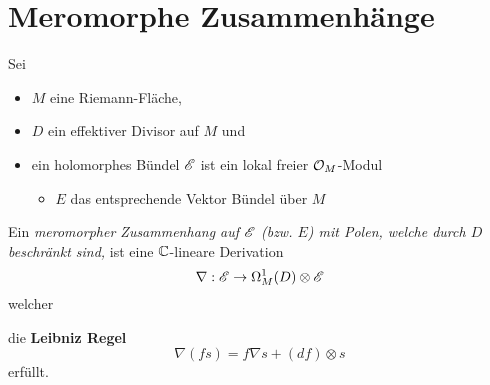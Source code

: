 \section{Meromorphe Zusammenhänge} %
Sei
\begin{itemize}
  \item $M$ eine Riemann-Fläche\marginnote{$\C$},
  \item $D$ ein effektiver Divisor auf $M$ und
  \item ein holomorphes Bündel $\mathscr{E}$ ist ein lokal freier $\mathcal{O}_M$-Modul
    \begin{itemize}
      \item $E$ das entsprechende Vektor Bündel über $M$
    \end{itemize}
\end{itemize}
\begin{comment}
  \begin{itemize}
    \item ein meromorphes Bündel $\sM$ ist ein lokal freier $\cO_M(*Z)$-Modul
  \end{itemize}
\end{comment}
\begin{defn}
  Ein \emph{meromorpher Zusammenhang auf $\mathscr{E}$ (bzw. $E$) mit Polen, welche
  durch $D$ beschränkt sind,} ist eine $\C$-lineare Derivation
  \[
    \nabla:\mathscr{E}\to\Omega_M^1(D)\otimes\mathscr{E}
  \]
  welcher
  \begin{comment}
    \begin{itemize}
      \item für
        \begin{itemize}
          \item alle offenen Mengen $U\subset M$,
          \item alle Schnitte $s\in\Gamma(U,\sE)$ und
          \item alle holomorphen Funktionen $f\in\cO(U)$
        \end{itemize}
    \end{itemize}
  \end{comment}
  die \textbf{Leibniz Regel}
  \[
    \nabla(fs)=f\nabla s+(df)\otimes s
  \]
  erfüllt.


  \begin{comment}
    \begin{defn}
      Ein Zusammenhang heißt \emph{flach} oder \emph{integrabel} falls
      \begin{itemize}
        \item seine Krümmung $R_\nabla\equiv0$
      \end{itemize}
      wobei
      \begin{itemize}
        \item $R_\nabla
          :=\nabla\circ\nabla:\sE\to\Omega_M^2(D)\otimes_{\cO_M}\sE$
      \end{itemize}
      \begin{rem}[ \cite{sabbah2007isomonodromic} Rem 0.12.5]
        Falls $\dim(M)=1$ ist jeder Zusammenhang flach.
      \end{rem}
    \end{defn}
  \end{comment}
\end{defn}
